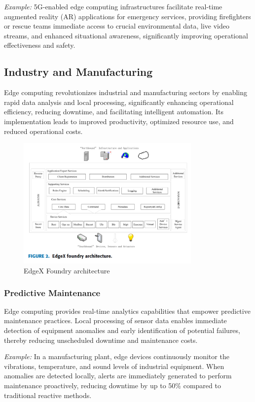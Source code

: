 \documentclass[runningheads]{llncs}
\begin{document}
\noindent\textit{Example:} 5G-enabled edge computing infrastructures facilitate real-time augmented reality (AR) applications for emergency services, providing firefighters or rescue teams immediate access to crucial environmental data, live video streams, and enhanced situational awareness, significantly improving operational effectiveness and safety.


\subsection{Industry and Manufacturing}

Edge computing revolutionizes industrial and manufacturing sectors by enabling rapid data analysis and local processing, significantly enhancing operational efficiency, reducing downtime, and facilitating intelligent automation. Its implementation leads to improved productivity, optimized resource use, and reduced operational costs.

\begin{figure}[ht]
    \centering
    \includegraphics[width=0.8\textwidth]{IMG/7.png}
    \caption{EdgeX Foundry architecture}
    \label{fig:edgex_architecture}
    \end{figure}
\FloatBarrier
\subsubsection{Predictive Maintenance}
Edge computing provides real-time analytics capabilities that empower predictive maintenance practices. Local processing of sensor data enables immediate detection of equipment anomalies and early identification of potential failures, thereby reducing unscheduled downtime and maintenance costs.

\noindent\textit{Example:} In a manufacturing plant, edge devices continuously monitor the vibrations, temperature, and sound levels of industrial equipment. When anomalies are detected locally, alerts are immediately generated to perform maintenance proactively, reducing downtime by up to 50\% compared to traditional reactive methods.
\end{document}
